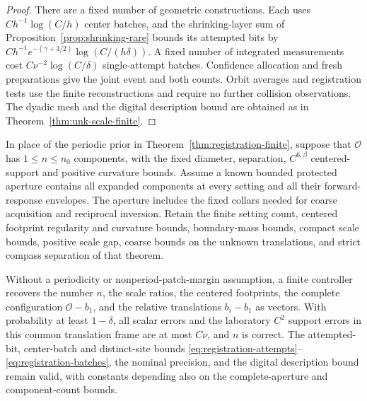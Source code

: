 \begin{proof}
There are a fixed number of geometric constructions. Each uses
$C h^{-1}\log(C/h)$ center batches, and the shrinking-layer sum of
Proposition~\ref{prop:shrinking-rare} bounds its attempted bits by
$C h^{-1}e^{-(\gamma+3/2)}\log(C/(h\delta))$. A fixed
number of integrated measurements cost
$C\nu^{-2}\log(C/\delta)$ single-attempt batches. Confidence
allocation and fresh preparations give the joint event and both
counts. Orbit averages and registration tests use the finite
reconstructions and require no further collision observations.
The dyadic mesh and the digital description bound are obtained
as in Theorem~\ref{thm:unk-scale-finite}.
\end{proof}

\begin{corollary}
\label{cor:registration-finite-cloud}
In place of the periodic prior in
Theorem~\ref{thm:registration-finite}, suppose that $\mathcal O$ has
$1\le n\le n_0$ components, with the fixed diameter, separation,
$C^{6,\beta}$ centered-support and positive curvature bounds.
Assume a known bounded protected aperture contains all expanded
components at every setting and all their forward-response envelopes.
The aperture includes the fixed collars needed for coarse acquisition
and reciprocal inversion. Retain the finite setting count, centered
footprint regularity and curvature bounds, boundary-mass bounds,
compact scale bounds, positive scale gap, coarse bounds on the unknown
translations, and strict compass separation of that theorem.

Without a periodicity or nonperiod-patch-margin assumption, a finite
controller recovers the number $n$, the scale ratios, the centered
footprints, the complete configuration $\mathcal O-b_1$, and the
relative translations $b_i-b_1$ as vectors. With probability at least
$1-\delta$, all scalar errors and the laboratory $C^2$ support errors
in this common translation frame are at most $C\nu$, and $n$ is
correct. The attempted-bit, center-batch and distinct-site bounds
\eqref{eq:registration-attempts}--\eqref{eq:registration-batches},
the nominal precision, and the digital description bound remain
valid, with constants depending also on the complete-aperture and
component-count bounds.
\end{corollary}
